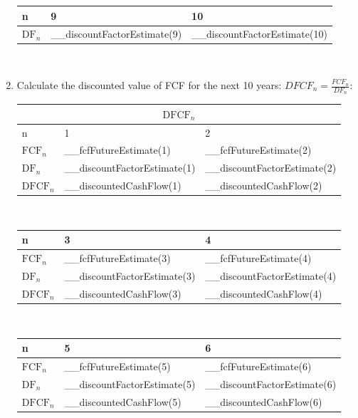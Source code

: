 \begin{enumerate}
\begin{tabularx}{\textwidth}{|X|X|X|}
 \hline
 n & 9 & 10 \\
 \hline
 \rowcolor{lightgray} $\text{DF}_n$ & __discountFactorEstimate(9) & __discountFactorEstimate(10) \\
 \hline
\end{tabularx}\\
	\item Calculate the discounted value of FCF for the next 10 years: $DFCF_n = \frac{FCF_n}{DF_n}$:\\
\begin{tabularx}{\textwidth}{|X|X|X|}
 \hline
 \multicolumn{3}{|c|}{$\text{DFCF}_n$} \\
 \hline
 n & 1 & 2 \\
 \hline
 $\text{FCF}_n$                       & __fcfFutureEstimate(1)      & __fcfFutureEstimate(2)      \\
 $\text{DF}_n$                        & __discountFactorEstimate(1) & __discountFactorEstimate(2) \\
 \rowcolor{lightgray} $\text{DFCF}_n$ & __discountedCashFlow(1)     & __discountedCashFlow(2)     \\
 \hline
\end{tabularx}\\

\begin{tabularx}{\textwidth}{|X|X|X|}
 \hline
 n & 3 & 4 \\
 \hline
 $\text{FCF}_n$                       & __fcfFutureEstimate(3)      & __fcfFutureEstimate(4)      \\
 $\text{DF}_n$                        & __discountFactorEstimate(3) & __discountFactorEstimate(4) \\
 \rowcolor{lightgray} $\text{DFCF}_n$ & __discountedCashFlow(3)     & __discountedCashFlow(4)     \\
 \hline
\end{tabularx}\\

\begin{tabularx}{\textwidth}{|X|X|X|}
 \hline
 n & 5 & 6 \\
 \hline
 $\text{FCF}_n$                       & __fcfFutureEstimate(5)      & __fcfFutureEstimate(6)      \\
 $\text{DF}_n$                        & __discountFactorEstimate(5) & __discountFactorEstimate(6) \\
 \rowcolor{lightgray} $\text{DFCF}_n$ & __discountedCashFlow(5)     & __discountedCashFlow(6)     \\
 \hline
\end{tabularx}\\


\end{enumerate}
